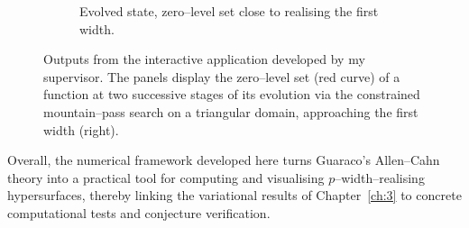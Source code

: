 \begin{figure}[ht]
\begin{subfigure}{0.47\textwidth}
    \caption{Evolved state, zero--level set close to realising the first width.}
  \end{subfigure}
  \caption{Outputs from the interactive application developed by my supervisor. The panels display the zero--level set (red curve) of a function at two successive stages of its evolution via the constrained mountain--pass search on a triangular domain, approaching the first width (right).}
\end{figure}
\FloatBarrier

\noindent Overall, the numerical framework developed here turns Guaraco’s Allen–Cahn theory into a 
practical tool for computing and visualising $p$–width–realising hypersurfaces, thereby 
linking the variational results of Chapter~\ref{ch:3} to concrete computational tests and 
conjecture verification.

